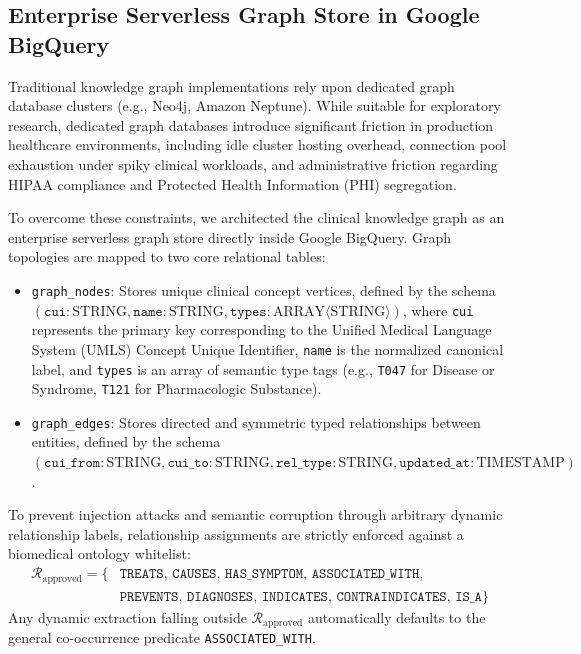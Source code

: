\documentclass[11pt, a4paper]{article}
\begin{document}
\subsection{Enterprise Serverless Graph Store in Google BigQuery}
Traditional knowledge graph implementations rely upon dedicated graph database clusters (e.g., Neo4j, Amazon Neptune). While suitable for exploratory research, dedicated graph databases introduce significant friction in production healthcare environments, including idle cluster hosting overhead, connection pool exhaustion under spiky clinical workloads, and administrative friction regarding HIPAA compliance and Protected Health Information (PHI) segregation.

To overcome these constraints, we architected the clinical knowledge graph as an enterprise serverless graph store directly inside Google BigQuery. Graph topologies are mapped to two core relational tables:
\begin{itemize}
  \item \texttt{graph\_nodes}: Stores unique clinical concept vertices, defined by the schema $(\texttt{cui}: \text{STRING}, \texttt{name}: \text{STRING}, \texttt{types}: \text{ARRAY}\langle\text{STRING}\rangle)$, where \texttt{cui} represents the primary key corresponding to the Unified Medical Language System (UMLS) Concept Unique Identifier, \texttt{name} is the normalized canonical label, and \texttt{types} is an array of semantic type tags (e.g., \texttt{T047} for Disease or Syndrome, \texttt{T121} for Pharmacologic Substance).
  \item \texttt{graph\_edges}: Stores directed and symmetric typed relationships between entities, defined by the schema $(\texttt{cui\_from}: \text{STRING}, \texttt{cui\_to}: \text{STRING}, \texttt{rel\_type}: \text{STRING}, \texttt{updated\_at}: \text{TIMESTAMP})$.
\end{itemize}

To prevent injection attacks and semantic corruption through arbitrary dynamic relationship labels, relationship assignments are strictly enforced against a biomedical ontology whitelist:
\begin{equation}
  \begin{aligned}
    \mathcal{R}_{\text{approved}} = \{ & \texttt{TREATS}, \, \texttt{CAUSES}, \, \texttt{HAS\_SYMPTOM}, \, \texttt{ASSOCIATED\_WITH}, \\
    & \texttt{PREVENTS}, \, \texttt{DIAGNOSES}, \, \texttt{INDICATES}, \, \texttt{CONTRAINDICATES}, \, \texttt{IS\_A} \}
  \end{aligned}
\end{equation}
Any dynamic extraction falling outside $\mathcal{R}_{\text{approved}}$ automatically defaults to the general co-occurrence predicate \texttt{ASSOCIATED\_WITH}.
\end{document}
